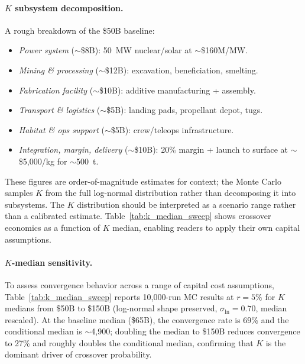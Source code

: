 \documentclass[preprint,12pt]{elsarticle}
\begin{document}
\paragraph{$K$ subsystem decomposition.} A rough breakdown of the \$50B baseline:
\begin{itemize}
  \item \emph{Power system} (${\sim}$\$8B): 50~MW nuclear/solar at ${\sim}$\$160M/MW.
  \item \emph{Mining \& processing} (${\sim}$\$12B): excavation, beneficiation, smelting.
  \item \emph{Fabrication facility} (${\sim}$\$10B): additive manufacturing + assembly.
  \item \emph{Transport \& logistics} (${\sim}$\$5B): landing pads, propellant depot, tugs.
  \item \emph{Habitat \& ops support} (${\sim}$\$5B): crew/teleops infrastructure.
  \item \emph{Integration, margin, delivery} (${\sim}$\$10B): 20\% margin + launch to surface at ${\sim}$\$5{,}000/kg for ${\sim}$500~t.
\end{itemize}
These figures are order-of-magnitude estimates for context; the Monte Carlo samples $K$ from the full log-normal distribution rather than decomposing it into subsystems. The $K$ distribution should be interpreted as a scenario range rather than a calibrated estimate. Table~\ref{tab:k_median_sweep} shows crossover economics as a function of $K$ median, enabling readers to apply their own capital assumptions.

\paragraph{$K$-median sensitivity.} To assess convergence behavior across a range of capital cost assumptions, Table~\ref{tab:k_median_sweep} reports 10{,}000-run MC results at $r = 5\%$ for $K$ medians from \$50B to \$150B (log-normal shape preserved, $\sigma_{\ln} = 0.70$, median rescaled). At the baseline median (\$65B), the convergence rate is 69\% and the conditional median is $\sim$4{,}900; doubling the median to \$150B reduces convergence to 27\% and roughly doubles the conditional median, confirming that $K$ is the dominant driver of crossover probability.
\end{document}
